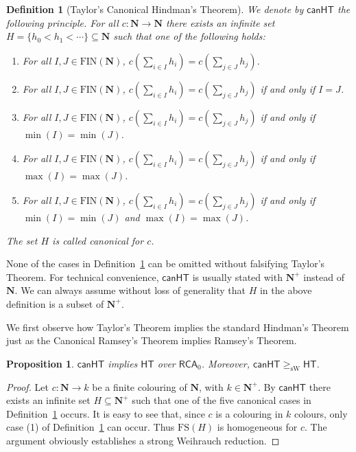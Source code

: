 \documentclass[a4paper,11pt]{article}
\newtheorem{definition}{Definition}
\newtheorem{proposition}{Proposition}
\newcommand\Nat{\mathbf{N}}
\newcommand\RCA{\mathsf{RCA}}
\newcommand\HT{\mathsf{HT}}
\newcommand\canHT{\mathsf{canHT}}
\newcommand\FIN{\mathrm{FIN}}
\newcommand\FS{\mathrm{FS}}
\newcommand\sW{\mathrm{sW}}
\begin{document}
\begin{definition}[Taylor's Canonical Hindman's Theorem]\label{thm:taylor}
We denote by $\canHT$ the following principle. For all $c: \Nat \to \Nat$ there exists an infinite set $H=\{h_0 < h_1 < \cdots \} \subseteq \Nat$ such that one of the following holds:
\begin{enumerate}
\item For all $I, J \in \FIN(\Nat)$, $c(\sum_{i \in I} h_i) = c(\sum_{j\in J} h_j)$.
\item For all $I, J \in \FIN(\Nat)$,  $c(\sum_{i \in I} h_i) = c(\sum_{j\in J} h_j)$ if and only if $I=J$.
\item For all $I, J \in \FIN(\Nat)$,  $c(\sum_{i \in I} h_i) = c(\sum_{j\in J} h_j)$ if and only if $\min(I)=\min(J)$.
\item For all $I, J \in \FIN(\Nat)$,  $c(\sum_{i \in I} h_i) = c(\sum_{j\in J} h_j)$ if and only if $\max(I)=\max(J)$.
\item For all $I, J \in \FIN(\Nat)$,  $c(\sum_{i \in I} h_i) = c(\sum_{j\in J} h_j)$ if and only if $\min(I)=\min(J)$ and $\max(I)=\max(J)$.
\end{enumerate}
The set $H$ is called {\em canonical} for $c$.
\end{definition}

None of the cases in Definition~\ref{thm:taylor} can be omitted without falsifying Taylor's Theorem. 
For technical convenience, $\canHT$ is usually stated with $\Nat^+$ instead of $\Nat$. We can always assume without loss of generality that $H$ in the above definition is a subset of $\Nat^+$.

We first observe how Taylor's Theorem implies the standard Hindman's Theorem just as the Canonical Ramsey's Theorem implies
Ramsey's Theorem. 

\begin{proposition}\label{prop:can_to_ht}
$\canHT$ implies $\HT$ over $\RCA_0$. Moreover, $\canHT \geq_\sW \HT$.
\end{proposition}

\begin{proof}
Let $c:\Nat\to k$ be a finite colouring of $\Nat$, with $k\in\Nat^+$. By $\canHT$ there exists an infinite
set $H\subseteq \Nat^+$ such that one of the five canonical cases in Definition~\ref{thm:taylor} occurs.
It is easy to see that, since $c$ is a colouring in $k$ colours, only case (1) of Definition~\ref{thm:taylor} can occur. Thus $\FS(H)$ is
homogeneous for $c$. The argument obviously establishes a strong Weihrauch reduction. 
\end{proof}
\end{document}
